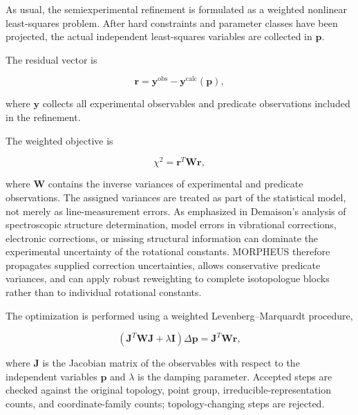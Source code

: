 \documentclass[aip,jcp,reprint,longbibliography,floatfix]{revtex4-2}
\begin{document}
As usual,\cite{Demaison2007EquilibriumReview,Demaison2011EquilibriumStructures,Mendolicchio2017MSR}
the semiexperimental refinement is formulated as a weighted nonlinear
least-squares problem.
After hard constraints and parameter classes have been projected, the actual independent
least-squares variables are collected in $\mathbf{p}$.

The residual vector is

\begin{equation}
\mathbf{r}
= \mathbf{y}^{\mathrm{obs}}
- \mathbf{y}^{\mathrm{calc}}(\mathbf{p}),
\end{equation}

where $\mathbf{y}$ collects all experimental observables and predicate
observations included in the refinement.

The weighted objective is

\begin{equation}
\chi^2
=
\mathbf{r}^{T}
\mathbf{W}
\mathbf{r},
\end{equation}

where $\mathbf{W}$ contains the inverse variances of experimental and predicate
observations. The assigned variances are treated as part of the statistical
model, not merely as line-measurement errors. As emphasized in Demaison's
analysis of spectroscopic structure determination,\cite{Demaison2007EquilibriumReview}
model errors in vibrational corrections, electronic corrections, or missing
structural information can dominate the experimental uncertainty of the
rotational constants. MORPHEUS therefore propagates supplied correction
uncertainties, allows conservative predicate variances, and can apply robust
reweighting to complete isotopologue blocks rather than to individual
rotational constants.

The optimization is performed using a weighted Levenberg--Marquardt procedure,

\begin{equation}
\left(
\mathbf{J}^{T}
\mathbf{W}
\mathbf{J}
+
\lambda \mathbf{I}
\right)
\Delta \mathbf{p}
=
\mathbf{J}^{T}
\mathbf{W}
\mathbf{r},
\label{eq:lm-step}
\end{equation}

where $\mathbf{J}$ is the Jacobian matrix of the observables with respect to
the independent variables $\mathbf{p}$ and $\lambda$ is the damping parameter.
Accepted steps are checked against the original topology, point group,
irreducible-representation counts, and coordinate-family counts; topology-changing
steps are rejected.
\end{document}
